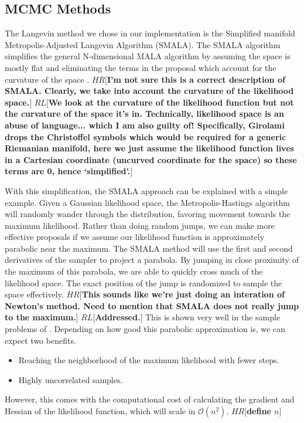 \documentclass{aa}
\def\memohr#1{\color{blue}$HR[${\bf #1}$]$ \color{black}}
\def\memorl#1{\color{gray}$RL[${\bf #1}$]$ \color{black}}
\begin{document}
\subsection{MCMC Methods}
The Langevin method we chose in our implementation is the Simplified manifold Metropolis-Adjusted Langevin Algorithm (SMALA). 
The SMALA algorithm simplifies the general N-dimensional MALA algorithm by assuming the space is mostly flat and eliminating the terms in the proposal which account for the curvature of the space \citep{Girolami2011}.
\memohr{I'm not sure this is a correct description of SMALA. Clearly, we take into account the curvature of the likelihood space.}
\memorl{We look at the curvature of the likelihood function but not the curvature of the space it's in. Technically, likelihood space is an abuse of language... which I am also guilty of! Specifically, Girolami drops the Christoffel symbols which would be required for a generic Riemanian manifold, here we just assume the likelihood function lives in a Cartesian coordinate (uncurved coordinate for the space) so these terms are 0, hence `simplified'.}

With this simplification, the SMALA approach can be explained with a simple example. 
Given a Gaussian likelihood space, the Metropolis-Hastings algorithm will randomly wander through the distribution, favoring movement towards the maximum likelihood.
Rather than doing random jumps, we can make more effective proposals if we assume our likelihood function is approximately parabolic near the maximum. 
The SMALA method will use the first and second derivatives of the sampler to project a parabola. 
By jumping in close proximity of the maximum of this parabola, we are able to quickly cross much of the likelihood space. 
The exact position of the jump is randomized to sample the space effectively.
\memohr{This sounds like we're just doing an interation of Newton's method. Need to mention that SMALA does not really jump to the maximum.}
\memorl{Addressed.}
This is shown very well in the sample problems of \cite{Girolami2011}. 
Depending on how good this parabolic approximation is, we can expect two benefits.
\begin{itemize}
\item Reaching the neighborhood of the maximum likelihood with fewer steps.
\item Highly uncorrelated samples.
\end{itemize}
However, this comes with the computational cost of calculating the gradient and Hessian of the likelihood function, which will scale in $\mathcal{O}(n^2)$.
\memohr{define $n$}
\end{document}
